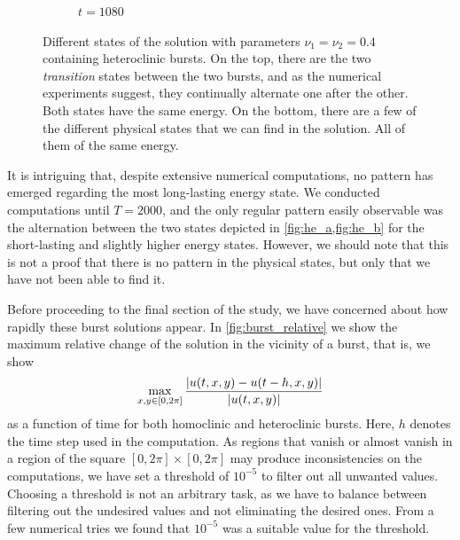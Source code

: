 \documentclass[twoside]{article}
\begin{document}
\begin{figure}[ht]
\begin{subfigure}[ht]{0.248\textwidth}
    \caption{$t= 1080$}
  \end{subfigure}\hfill
  \caption{Different states of the solution with parameters $\nu_1=\nu_2=0.4$ containing heteroclinic bursts. On the top, there are the two \emph{transition} states between the two bursts, and as the numerical experiments suggest, they continually alternate one after the other. Both states have the same energy. On the bottom, there are a few of the different physical states that we can find in the solution. All of them of the same energy.}
  \label{fig:slices_burst}
\end{figure}

It is intriguing that, despite extensive numerical computations, no pattern has emerged regarding the most long-lasting energy state. We conducted computations until $T=2000$, and the only regular pattern easily observable was the alternation between the two states depicted in \cref{fig:he_a,fig:he_b} for the short-lasting and slightly higher energy states. However, we should note that this is not a proof that there is no pattern in the physical states, but only that we have not been able to find it.

Before proceeding to the final section of the study, we have concerned about how rapidly these burst solutions appear. In \cref{fig:burst_relative} we show the maximum relative change of the solution in the vicinity of a burst, that is, we show
\begin{equation}
  \max_{x,y\in [0,2\pi]} \frac{\abs{u(t,x,y)-u(t-h,x,y)}}{\abs{u(t,x,y)}}
\end{equation}
as a function of time for both homoclinic and heteroclinic bursts. Here, $h$ denotes the time step used in the computation. As regions that vanish or almost vanish in a region of the square $[0,2\pi]\times[0,2\pi]$ may produce inconsistencies on the computations, we have set a threshold of $10^{-5}$ to filter out all unwanted values. Choosing a threshold is not an arbitrary task, as we have to balance between filtering out the undesired values and not eliminating the desired ones. From a few numerical tries we found that $10^{-5}$ was a suitable value for the threshold.
\end{document}
